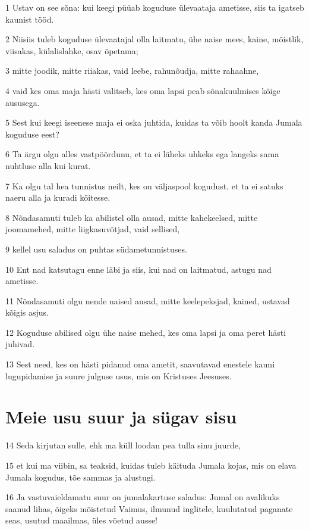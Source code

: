 \par 1 Ustav on see sõna: kui keegi püüab koguduse ülevaataja ametisse, siis ta igatseb kaunist tööd.
\par 2 Niisiis tuleb koguduse ülevaatajal olla laitmatu, ühe naise mees, kaine, mõistlik, viisakas, külalislahke, osav õpetama;
\par 3 mitte joodik, mitte riiakas, vaid leebe, rahunõudja, mitte rahaahne,
\par 4 vaid kes oma maja hästi valitseb, kes oma lapsi peab sõnakuulmises kõige aususega.
\par 5 Sest kui keegi iseenese maja ei oska juhtida, kuidas ta võib hoolt kanda Jumala koguduse eest?
\par 6 Ta ärgu olgu alles vastpöördunu, et ta ei läheks uhkeks ega langeks sama nuhtluse alla kui kurat.
\par 7 Ka olgu tal hea tunnistus neilt, kes on väljaspool kogudust, et ta ei satuks naeru alla ja kuradi köitesse.
\par 8 Nõndasamuti tuleb ka abilistel olla ausad, mitte kahekeelsed, mitte joomamehed, mitte liigkasuvõtjad, vaid sellised,
\par 9 kellel usu saladus on puhtas südametunnistuses.
\par 10 Ent nad katsutagu enne läbi ja siis, kui nad on laitmatud, astugu nad ametisse.
\par 11 Nõndasamuti olgu nende naised ausad, mitte keelepeksjad, kained, ustavad kõigis asjus.
\par 12 Koguduse abilised olgu ühe naise mehed, kes oma lapsi ja oma peret hästi juhivad.
\par 13 Sest need, kes on hästi pidanud oma ametit, saavutavad enestele kauni lugupidamise ja suure julguse usus, mis on Kristuses Jeesuses.

\section*{Meie usu suur ja sügav sisu}

\par 14 Seda kirjutan sulle, ehk ma küll loodan pea tulla sinu juurde,
\par 15 et kui ma viibin, sa teaksid, kuidas tuleb käituda Jumala kojas, mis on elava Jumala kogudus, tõe sammas ja alustugi.
\par 16 Ja vastuvaieldamatu suur on jumalakartuse saladus: Jumal on avalikuks saanud lihas, õigeks mõistetud Vaimus, ilmunud inglitele, kuulutatud paganate seas, usutud maailmas, üles võetud ausse!


